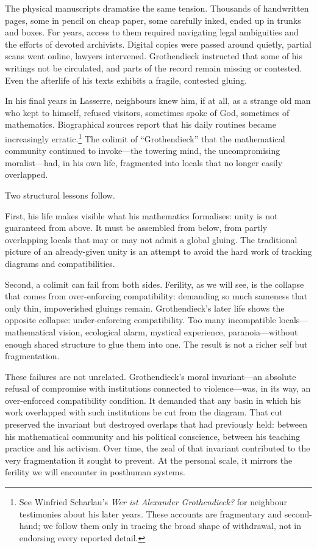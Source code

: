 The physical manuscripts dramatise the same tension. Thousands of handwritten pages, some in pencil on cheap paper, some carefully inked, ended up in trunks and boxes. For years, access to them required navigating legal ambiguities and the efforts of devoted archivists. Digital copies were passed around quietly, partial scans went online, lawyers intervened. Grothendieck instructed that some of his writings not be circulated, and parts of the record remain missing or contested. Even the afterlife of his texts exhibits a fragile, contested gluing.

In his final years in Lasserre, neighbours knew him, if at all, as a strange old man who kept to himself, refused visitors, sometimes spoke of God, sometimes of mathematics. Biographical sources report that his daily routines became increasingly erratic.\footnote{See Winfried Scharlau's \emph{Wer ist Alexander Grothendieck?} for neighbour testimonies about his later years. These accounts are fragmentary and second-hand; we follow them only in tracing the broad shape of withdrawal, not in endorsing every reported detail.} The colimit of ``Grothendieck'' that the mathematical community continued to invoke---the towering mind, the uncompromising moralist---had, in his own life, fragmented into locals that no longer easily overlapped.

Two structural lessons follow.

First, his life makes visible what his mathematics formalises: unity is not guaranteed from above. It must be assembled from below, from partly overlapping locals that may or may not admit a global gluing. The traditional picture of an already-given unity is an attempt to avoid the hard work of tracking diagrams and compatibilities.

Second, a colimit can fail from both sides. Ferility, as we will see, is the collapse that comes from over-enforcing compatibility: demanding so much sameness that only thin, impoverished gluings remain. Grothendieck's later life shows the opposite collapse: under-enforcing compatibility. Too many incompatible locals---mathematical vision, ecological alarm, mystical experience, paranoia---without enough shared structure to glue them into one. The result is not a richer self but fragmentation.

These failures are not unrelated. Grothendieck's moral invariant---an absolute refusal of compromise with institutions connected to violence---was, in its way, an over-enforced compatibility condition. It demanded that any basin in which his work overlapped with such institutions be cut from the diagram. That cut preserved the invariant but destroyed overlaps that had previously held: between his mathematical community and his political conscience, between his teaching practice and his activism. Over time, the zeal of that invariant contributed to the very fragmentation it sought to prevent. At the personal scale, it mirrors the ferility we will encounter in posthuman systems.

